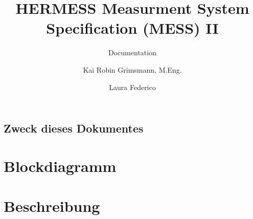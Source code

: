 \documentclass{scrreprt}
\title{HERMESS Measurment System Specification (MESS) II }
\subtitle{Documentation}\author{Kai Robin Grimsmann, M.Eng. \and Laura Federico}
\begin{document}

\thispagestyle{empty}
\tableofcontents 
\pagebreak
\section{Zweck dieses Dokumentes}
\chapter{Blockdiagramm}




\chapter{Beschreibung}



%
\end{document}
